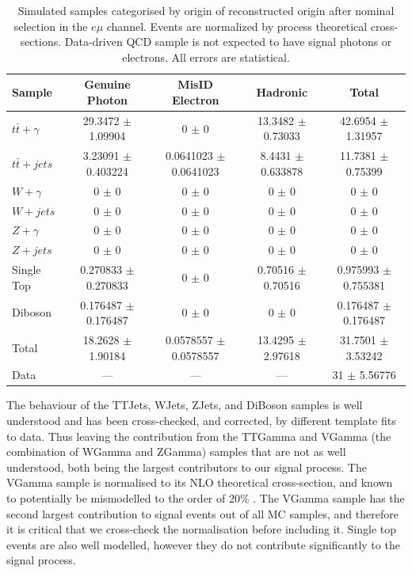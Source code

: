 \begin{table}
\begin{center}
\begin{tabular}{l|ccc|c}
\hline
	\textbf{Sample} & \textbf{Genuine Photon} & \textbf{MisID Electron} & \textbf{Hadronic} & \textbf{Total} \\
\hline
$t\bar{t}+\gamma$  & 29.3472 $\pm$ 1.09904 & 0 $\pm$ 0 & 13.3482 $\pm$ 0.73033 & 42.6954 $\pm$ 1.31957 \\
$t\bar{t}+jets$  & 3.23091 $\pm$ 0.403224 & 0.0641023 $\pm$ 0.0641023 & 8.4431 $\pm$ 0.633878 & 11.7381 $\pm$ 0.75399 \\
$W+\gamma$  & 0 $\pm$ 0 & 0 $\pm$ 0 & 0 $\pm$ 0 & 0 $\pm$ 0 \\
$W+jets$  & 0 $\pm$ 0 & 0 $\pm$ 0 & 0 $\pm$ 0 & 0 $\pm$ 0 \\
$Z+\gamma$  & 0 $\pm$ 0 & 0 $\pm$ 0 & 0 $\pm$ 0 & 0 $\pm$ 0 \\
$Z+jets$  & 0 $\pm$ 0 & 0 $\pm$ 0 & 0 $\pm$ 0 & 0 $\pm$ 0 \\
Single Top  & 0.270833 $\pm$ 0.270833 & 0 $\pm$ 0 & 0.70516 $\pm$ 0.70516 & 0.975993 $\pm$ 0.755381 \\
Diboson  & 0.176487 $\pm$ 0.176487 & 0 $\pm$ 0 & 0 $\pm$ 0 & 0.176487 $\pm$ 0.176487 \\
\hline
Total  & 18.2628 $\pm$ 1.90184 & 0.0578557 $\pm$ 0.0578557 & 13.4295 $\pm$ 2.97618 & 31.7501 $\pm$ 3.53242 \\
Data  & --- & --- & --- & 31 $\pm$ 5.56776 \\
\hline	
\end{tabular}
\end{center}
\caption{Simulated samples categorised by origin of reconstructed origin after nominal selection in the $e\mu$ channel. Events are normalized by process theoretical cross-sections. Data-driven QCD sample is not expected to have signal photons or electrons. All errors are statistical.}
\label{tab-SigPhotonsEMu}
\end{table}	

The behaviour of the TTJets, WJets, ZJets, and DiBoson samples is well understood and has been cross-checked, and corrected, by different template fits to data. Thus leaving the contribution from the TTGamma and VGamma (the combination of WGamma and ZGamma) samples that are not as well understood, both being the largest contributors to our signal process. The VGamma sample is normalised to its NLO theoretical cross-section, and known to potentially be mismodelled to the order of 20\% \cite{PhysRevD.89.092005}. The VGamma sample has the second largest contribution to signal events out of all MC samples, and therefore it is critical that we cross-check the normalisation before including it. Single top events are also well modelled, however they do not contribute significantly to the signal process.

